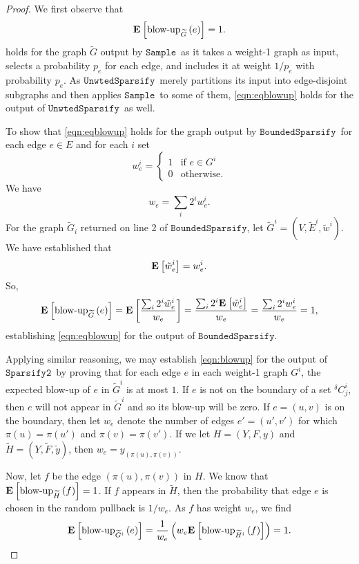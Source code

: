 \documentclass[11pt]{article}
\newcommand{\sparsifytwo}{\ensuremath{\mathtt{Sparsify2}}}
\newcommand{\unwtedsparsify}{\ensuremath{\mathtt{UnwtedSparsify}}}
\newcommand{\boundedsparsify}{\ensuremath{\mathtt{BoundedSparsify}}}
\newcommand{\sample}{\ensuremath{\mathtt{Sample}}}
\def\Htil{\widetilde{H}}
\def\Gtil{\widetilde{G}}
\def\Etil{\widetilde{E}}
\def\Ftil{\widetilde{F}}
\def\wtil{\tilde{w}}
\def\ytil{\tilde{y}}
\def\expec#1#2{\mbox{\bf E}_{#1}\left[ #2 \right]}
\def\blowup#1#2{\textrm{blow-up}_{#1}\left( #2 \right)}
\def\preDelta#1{{}^{\delta}\!{#1}}
\begin{document}
\begin{proof}
We first observe that
\begin{equation}\label{eqn:eqblowup}
  \expec{}{\blowup{\Gtil }{e}} = 1.
\end{equation}
 holds for the graph $\Gtil$ output
  by \sample \, as it takes a weight-1 graph as input, selects a
  probability $p_{e}$ for each edge, and includes it at weight $1/p_{e}$
  with probability $p_{e}$.
As \unwtedsparsify  \ merely partitions its input into edge-disjoint
  subgraphs and then applies \sample \ to some of them, \eqref{eqn:eqblowup}
  holds for the output of \unwtedsparsify \ as well.

To show that \eqref{eqn:eqblowup} holds for the graph output by
  \boundedsparsify \, for each edge $e \in E$ and for each $i$ set
\[
w_{e}^{i}
=
\begin{cases}
1 & \text{if $e \in G^{i}$}
\\
0 & \text{otherwise}.
\end{cases}
\]
We have
\[
  w_{e} = \sum_{i} 2^{i} w_{e}^{i}.
\]
For the graph $\Gtil_{i}$ returned on line 2 of \boundedsparsify, let
  $\Gtil^{i} = (V, \Etil^{i}, \wtil^{i})$.
We have established that
\[
  \expec{}{\wtil^{i}_{e}} = w^{i}_{e}.
\]
So,
\[
 \expec{}{\blowup{\Gtil }{e}}
=
\expec{}{\frac{\sum_{i} 2^{i} \wtil^{i}_{e}}{w_{e}}}
=
 \frac{\sum_{i} 2^{i} \expec{}{\wtil^{i}_{e}}}{w_{e}}
=
 \frac{\sum_{i} 2^{i} w^{i}_{e}}{w_{e}}
=
1,
\]
establishing \eqref{eqn:eqblowup} for the output of \boundedsparsify .

Applying similar reasoning, we may establish \eqref{eqn:blowup} for
  the output of \sparsifytwo \ by proving that for each edge $e$ in
  each weight-1 graph $G^{i}$,
  the expected blow-up of $e$ in $\Gtil^{i}$ is at most $1$.
If $e$ is not on the boundary of a set $\preDelta{C}^{i}_{j}$,
  then $e$ will not appear in $\Gtil^{i}$ and so its blow-up will be zero.
If $e = (u,v)$ is on the boundary, then let $w_{e}$ denote the number
  of edges $e' = (u', v')$ for which $\pi (u) = \pi (u')$ and $\pi (v) = \pi (v')$.
If we let $H = (Y, F, y)$ and $\Htil = (Y, \Ftil , \ytil )$,
  then $w_{e} = y_{(\pi (u), \pi (v))}$.

Now, let $f$ be the edge $(\pi (u), \pi (v))$ in $H$.
We know that $\expec{}{\blowup{\Htil}{f}} = 1$.
If $f$ appears in $\Htil$, then the probability that edge $e$ is chosen
  in the random pullback is $1/w_{e}$.
As $f$ has weight $w_{e}$, we find
\[
  \expec{}{\blowup{\Gtil^{i}}{e}}
=
\frac{1}{w_{e}} \left(w_{e}   \expec{}{\blowup{\Htil^{i}}{f}}  \right)
= 1.
\]
\end{proof}
\end{document}
